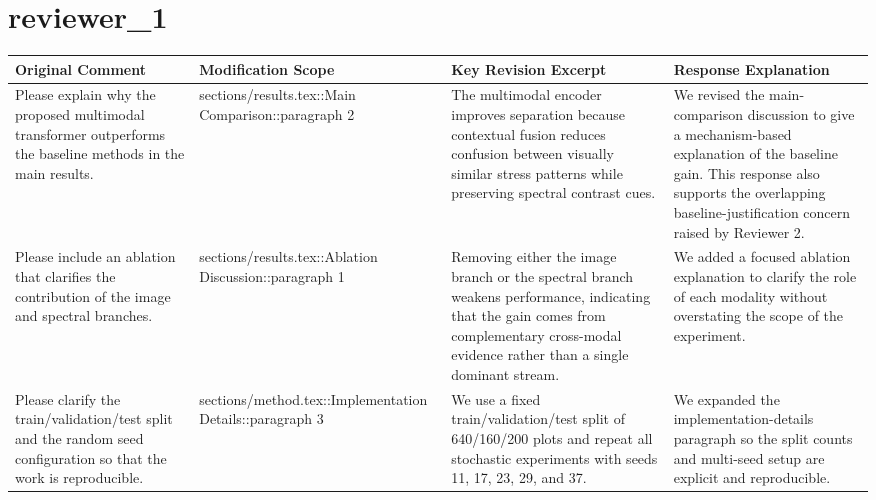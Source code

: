 \documentclass{article}
\begin{document}
\section*{ reviewer\_1 }
\begin{longtable}{|p{}|p{}|p{}|p{}|}
\hline
Original Comment & Modification Scope & Key Revision Excerpt & Response Explanation \\
\hline
Please explain why the proposed multimodal transformer outperforms the baseline methods in the main results. & sections/results.tex::Main Comparison::paragraph 2 & The multimodal encoder improves separation because contextual fusion reduces confusion between visually similar stress patterns while preserving spectral contrast cues. & We revised the main-comparison discussion to give a mechanism-based explanation of the baseline gain. This response also supports the overlapping baseline-justification concern raised by Reviewer 2. \\
\hline
Please include an ablation that clarifies the contribution of the image and spectral branches. & sections/results.tex::Ablation Discussion::paragraph 1 & Removing either the image branch or the spectral branch weakens performance, indicating that the gain comes from complementary cross-modal evidence rather than a single dominant stream. & We added a focused ablation explanation to clarify the role of each modality without overstating the scope of the experiment. \\
\hline
Please clarify the train/validation/test split and the random seed configuration so that the work is reproducible. & sections/method.tex::Implementation Details::paragraph 3 & We use a fixed train/validation/test split of 640/160/200 plots and repeat all stochastic experiments with seeds 11, 17, 23, 29, and 37. & We expanded the implementation-details paragraph so the split counts and multi-seed setup are explicit and reproducible. \\
\hline
\end{longtable}
\end{document}
